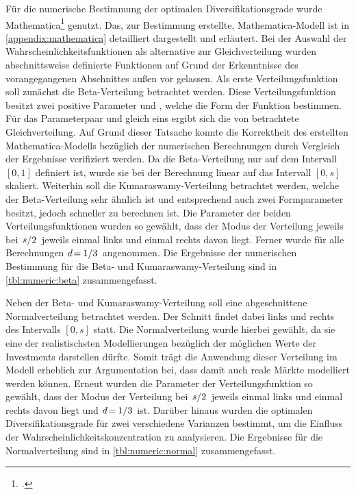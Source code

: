 Für die numerische Bestimmung der optimalen Diversifikationsgrade wurde Mathematica\footcite{mathematica} genutzt. Das, zur Bestimmung erstellte, Mathematica-Modell ist in \cref{appendix:mathematica} detailliert dargestellt und erläutert. Bei der Auswahl der Wahrscheinlichkeitsfunktionen als alternative zur Gleichverteilung wurden abschnittsweise definierte Funktionen auf Grund der Erkenntnisse des vorangegangenen Abschnittes außen vor gelassen. Als erste Verteilungsfunktion soll zunächst die Beta-Verteilung betrachtet werden. Diese Verteilungsfunktion besitzt zwei positive Parameter \textalpha{} und \textbeta{}, welche die Form der Funktion bestimmen. Für das Parameterpaar \textalpha{} und \textbeta{} gleich eins ergibt sich die von \citeauthor{Wagner-2010} betrachtete Gleichverteilung. Auf Grund dieser Tatsache konnte die Korrektheit des erstellten Mathematica-Modells bezüglich der numerischen Berechnungen durch Vergleich der Ergebnisse verifiziert werden. Da die Beta-Verteilung nur auf dem Intervall $[0,1]$ definiert ist, wurde sie bei der Berechnung linear auf das Intervall $[0,s]$ skaliert. Weiterhin soll die Kumaraswamy-Verteilung betrachtet werden, welche der Beta-Verteilung sehr ähnlich ist und entsprechend auch zwei Formparameter besitzt, jedoch schneller zu berechnen ist. Die Parameter der beiden Verteilungsfunktionen wurden so gewählt, dass der Modus der Verteilung jeweils bei $\flatfrac{s}{2}$ \bzw{} jeweils einmal links und einmal rechts davon liegt. Ferner wurde für alle Berechnungen $d\!=\!\flatfrac{1}{3}$ angenommen. Die Ergebnisse der numerischen Bestimmung für die Beta- und Kumaraswamy-Verteilung sind in \cref{tbl:numeric:beta} zusammengefasst.

Neben der Beta- und Kumaraswamy-Verteilung soll eine abgeschnittene Normalverteilung betrachtet werden. Der Schnitt findet dabei links und rechts des Intervalls $[0,s]$ statt. Die Normalverteilung wurde hierbei gewählt, da sie eine der realistischsten Modellierungen bezüglich der möglichen Werte der Investments darstellen dürfte. Somit trägt die Anwendung dieser Verteilung im Modell erheblich zur Argumentation bei, dass damit auch reale Märkte modelliert werden können. Erneut wurden die Parameter der Verteilungsfunktion so gewählt, dass der Modus der Verteilung bei $\flatfrac{s}{2}$ \bzw{} jeweils einmal links und einmal rechts davon liegt und $d\!=\!\flatfrac{1}{3}$ ist. Darüber hinaus wurden die optimalen Diversifikationsgrade für zwei verschiedene Varianzen bestimmt, um die Einfluss der Wahrscheinlichkeitskonzentration zu analysieren. Die Ergebnisse für die Normalverteilung sind in \cref{tbl:numeric:normal} zusammengefasst.

